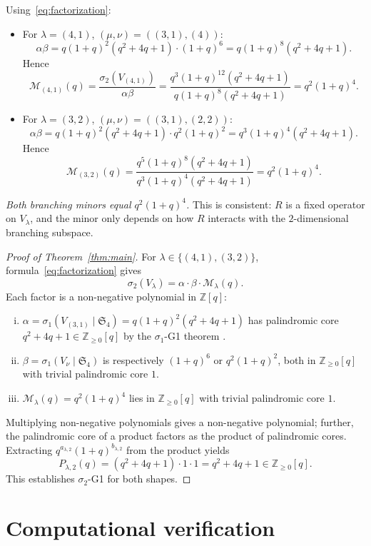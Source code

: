 \documentclass[11pt]{article}
\theoremstyle{plain}
\theoremstyle{definition}
\theoremstyle{remark}
\newcommand{\Z}{\mathbb{Z}}
\newcommand{\Sym}{\mathfrak{S}}
\begin{document}
Using~\eqref{eq:factorization}:

\begin{itemize}[leftmargin=*]
\item For $\lambda = (4,1)$, $(\mu,\nu) = ((3,1), (4))$:
\[ \alpha\beta = q(1+q)^2(q^2+4q+1) \cdot (1+q)^6 = q(1+q)^8 (q^2+4q+1). \]
Hence
\[ \mathcal{M}_{(4,1)}(q) = \frac{\sigma_2(V_{(4,1)})}{\alpha \beta} = \frac{q^3(1+q)^{12}(q^2+4q+1)}{q(1+q)^8(q^2+4q+1)} = q^2 (1+q)^4. \]

\item For $\lambda = (3,2)$, $(\mu,\nu) = ((3,1), (2,2))$:
\[ \alpha\beta = q(1+q)^2(q^2+4q+1) \cdot q^2(1+q)^2 = q^3(1+q)^4(q^2+4q+1). \]
Hence
\[ \mathcal{M}_{(3,2)}(q) = \frac{q^5(1+q)^8(q^2+4q+1)}{q^3(1+q)^4(q^2+4q+1)} = q^2(1+q)^4. \]
\end{itemize}

\emph{Both branching minors equal $q^2(1+q)^4$.} This is consistent: $R$ is a fixed
operator on $V_\lambda$, and the minor only depends on how $R$ interacts with the
$2$-dimensional branching subspace.

\begin{proof}[Proof of Theorem~\ref{thm:main}]
For $\lambda \in \{(4,1), (3,2)\}$, formula~\eqref{eq:factorization} gives
\[ \sigma_2(V_\lambda) = \alpha \cdot \beta \cdot \mathcal{M}_\lambda(q). \]
Each factor is a non-negative polynomial in $\Z[q]$:
\begin{enumerate}[(i)]
\item $\alpha = \sigma_1(V_{(3,1)} \mid \Sym_4) = q(1+q)^2(q^2+4q+1)$ has palindromic core $q^2+4q+1 \in \Z_{\geq 0}[q]$ by the $\sigma_1$-G1 theorem \cite{Clio_sigma1}.
\item $\beta = \sigma_1(V_\nu \mid \Sym_4)$ is respectively $(1+q)^6$ or $q^2(1+q)^2$, both in $\Z_{\geq 0}[q]$ with trivial palindromic core $1$.
\item $\mathcal{M}_\lambda(q) = q^2(1+q)^4$ lies in $\Z_{\geq 0}[q]$ with trivial palindromic core $1$.
\end{enumerate}
Multiplying non-negative polynomials gives a non-negative polynomial; further,
the palindromic core of a product factors as the product of palindromic cores.
Extracting $q^{a_{\lambda,2}}(1+q)^{b_{\lambda,2}}$ from the product yields
\[ P_{\lambda,2}(q) = (q^2+4q+1) \cdot 1 \cdot 1 = q^2+4q+1 \in \Z_{\geq 0}[q]. \]
This establishes $\sigma_2$-G1 for both shapes.
\end{proof}

\section{Computational verification}
\end{document}
